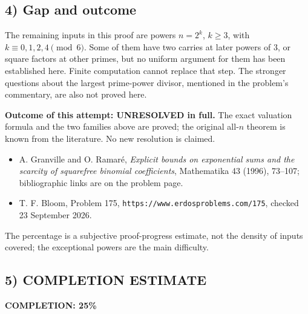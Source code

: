 \subsection{4) Gap and outcome}
The remaining inputs in this proof are powers $n=2^k$, $k\geq3$, with
$k\equiv0,1,2,4\pmod6$. Some of them have two carries at later powers
of $3$, or square factors at other primes, but no uniform argument for
them has been established here. Finite computation cannot replace that
step. The stronger questions about the largest prime-power divisor,
mentioned in the problem's commentary, are also not proved here.

\textbf{Outcome of this attempt: UNRESOLVED in full.} The exact valuation
formula and the two families above are proved; the original all-$n$
theorem is known from the literature. No new resolution is claimed.
\begin{itemize}
\item A. Granville and O. Ramar\'e, \emph{Explicit bounds on exponential
sums and the scarcity of squarefree binomial coefficients}, Mathematika
43 (1996), 73--107; bibliographic links are on the problem page.
\item T. F. Bloom, Problem 175,
\texttt{https://www.erdosproblems.com/175}, checked 23 September 2026.
\end{itemize}
The percentage is a subjective proof-progress estimate, not the density
of inputs covered; the exceptional powers are the main difficulty.
\subsection{5) COMPLETION ESTIMATE}
\textbf{COMPLETION: 25\%}
